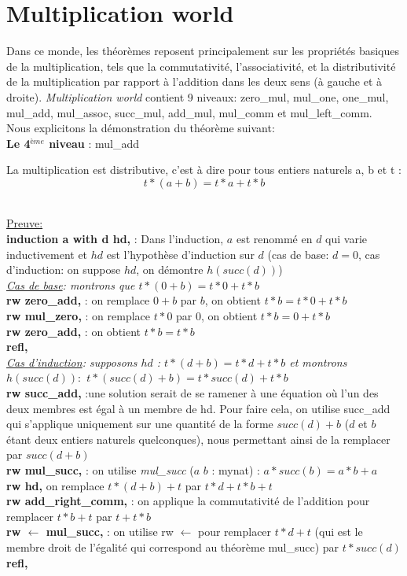 \documentclass{article}
\begin{document}
\section{Multiplication world}
Dans ce monde, les théorèmes reposent principalement sur les propriétés basiques de la multiplication, tels que la commutativité, l'associativité, et la distributivité de la multiplication par rapport à l'addition dans les deux sens (à gauche et à droite). \textit{Multiplication world} contient 9 niveaux: zero\_mul, mul\_one, one\_mul, mul\_add, mul\_assoc, succ\_mul, add\_mul, mul\_comm et mul\_left\_comm.\\ Nous explicitons la démonstration du théorème suivant: \\
\textbf{Le 4$^{ème}$ niveau} : mul\_add  \begin{center} La multiplication est distributive, c'est à dire pour tous entiers naturels a, b et t : $$t*(a+b)=t*a+t*b$$ \end{center}\\
{\large\underline{Preuve:}} \\
\textbf{induction a with d hd,} : Dans l'induction, \textbf{$a$} est renommé en \textbf{$d$} qui varie inductivement et \textbf{$hd$} est l'hypothèse d'induction sur $d$ (cas de base: $d=0$, cas d'induction: on suppose $hd$, on démontre $h(succ(d))$)   \\
\textit{\underline{Cas de base}: montrons que $t * (0 + b) = t * 0 + t * b$}\\
\textbf{rw zero\_add,} : on remplace $0+b$ par $b$, on obtient $t*b=t*0+t*b$ \\
\textbf{rw mul\_zero,} : on remplace $t*0$ par $0$, on obtient $t*b=0+t*b$ \\
\textbf{rw zero\_add,} : on obtient $t*b=t*b$ \\
\textbf{refl,} \\
\textit{\underline{Cas d'induction}: supposons $hd$ : $t*(d+b) = t * d + t * b$ et montrons $h(succ(d)):$ $t * (succ (d) + b) = t * succ (d) + t * b$ }\\
\textbf{rw succ\_add,} :une solution serait de se ramener à une équation où l'un des deux membres est égal à un membre de hd. Pour faire cela, on utilise succ\_add qui s'applique uniquement sur une quantité de la forme $succ(d)+b$ ($d$ et $b$ étant deux entiers naturels quelconques), nous permettant ainsi de la remplacer par $succ(d+b)$\\
\textbf{rw mul\_succ,} : on utilise \textit{mul\_succ} ($a$ $b$ : mynat) : $a * succ(b) = a * b + a $\\
\textbf{rw hd,} on remplace $t * (d + b) + t$ par $t * d + t * b+t$\\
\textbf{rw add\_right\_comm,} : on applique la commutativité de l'addition pour remplacer $t * b + t$ par $ t + t * b$\\
\textbf{rw $\leftarrow$  mul\_succ, }: on utilise rw $\leftarrow$ pour remplacer $t * d + t$ (qui est le membre droit de l'égalité qui correspond au théorème mul\_succ) par $t * succ (d)$ \\
\textbf{refl,} \\
\end{document}
